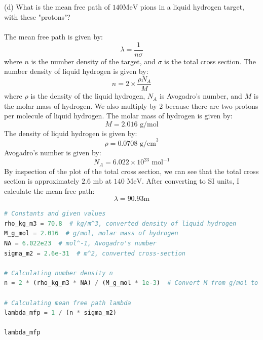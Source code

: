 \documentclass[12pt]{article}
\begin{document}
\subsection{}
(d) What is the mean free path of $140 \mathrm{MeV}$ pions in a liquid hydrogen target, with these "protons"?\\\\
The mean free path is given by:
\begin{equation}
\lambda = \frac{1}{n \sigma}
\end{equation}
where $n$ is the number density of the target, and $\sigma$ is the total cross section. The number density of liquid hydrogen is given by:
\begin{equation}
n = 2 \times \frac{\rho N_A}{M}
\end{equation}
where $\rho$ is the density of the liquid hydrogen, $N_A$ is Avogadro's number, and $M$ is the molar mass of hydrogen. We also multiply by 2 because there are two protons per molecule of liquid hydrogen. The molar mass of hydrogen is given by:
\begin{equation}
M = 2.016 \text{ g/mol}
\end{equation}
The density of liquid hydrogen is given by:
\begin{equation}
\rho = 0.0708 \text{ g/cm}^3
\end{equation}
Avogadro's number is given by:
\begin{equation}
N_A = 6.022 \times 10^{23} \text{ mol}^{-1}
\end{equation}
By inspection of the plot of the total cross section, we can see that the total cross section is approximately $2.6 \text{ mb}$ at $140 \text{ MeV}$. After converting to SI units, I calculate the mean free path:
\begin{equation}
\lambda = 90.93 \text{m}
\end{equation}
\begin{lstlisting}[language=Python]
# Constants and given values
rho_kg_m3 = 70.8  # kg/m^3, converted density of liquid hydrogen
M_g_mol = 2.016  # g/mol, molar mass of hydrogen
NA = 6.022e23  # mol^-1, Avogadro's number
sigma_m2 = 2.6e-31  # m^2, converted cross-section

# Calculating number density n
n = 2 * (rho_kg_m3 * NA) / (M_g_mol * 1e-3)  # Convert M from g/mol to kg/mol for consistency in SI units

# Calculating mean free path lambda
lambda_mfp = 1 / (n * sigma_m2)

lambda_mfp
\end{lstlisting}
\end{document}
